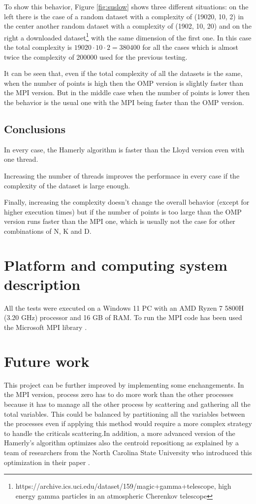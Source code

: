 \documentclass[conference]{IEEEtran}
\begin{document}
To show this behavior, Figure \ref{fig:suslow} shows three different situations: on the left there is the case of a random dataset with a complexity of (19020, 10, 2) in the center another random dataset with a complexity of (1902, 10, 20) and on the right a downloaded dataset\footnote{https://archive.ics.uci.edu/dataset/159/magic+gamma+telescope, high energy gamma particles in an atmospheric Cherenkov telescope} with the same dimension of the first one. In this case the total complexity is $19020\cdot 10\cdot 2 = 380400$ for all the cases which is almost twice the complexity of 200000 used for the previous testing.

It can be seen that, even if the total complexity of all the datasets is the same, when the number of points is high then the OMP version is slightly faster than the MPI version. But in the middle case when the number of points is lower then the behavior is the usual one with the MPI being faster than the OMP version.

\subsection{Conclusions}
In every case, the Hamerly algorithm is faster than the Lloyd version even with one thread. 

Increasing the number of threads improves the performace in every case if the complexity of the dataset is large enough.

Finally, increasing the complexity doesn't change the overall behavior (except for higher execution times) but if the number of points is too large than the OMP version runs faster than the MPI one, which is usually not the case for other combinations of N, K and D.

\section{Platform and computing system description}
All the tests were executed on a Windows 11 PC with an AMD Ryzen 7 5800H (3.20 GHz) processor and 16 GB of RAM. To run the MPI code has been used the Microsoft MPI library \cite{b2}.

\section{Future work}
This project can be further improved by implementing some enchangements.
In the MPI version, process zero has to do more work than the other processes because it has to manage all the other process by scattering and gathering all the total variables. This could be balanced by partitioning all the variables between the processes even if applying this method would require a more complex strategy to handle the criticals scattering.In addition, a more advanced version of the Hamerly's algorithm optimizes also the centroid repositiong as explained by a team of researchers from the North Carolina State University who introduced this optimization in their paper \cite{b3} .
\end{document}
